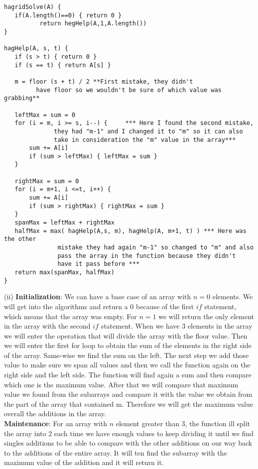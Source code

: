 \documentclass[12pt]{article} \setlength{\oddsidemargin}{0in}
\begin{document}
{\begin{verbatim}
hagridSolve(A) {
   if(A.length()==0) { return 0 }
          return hegHelp(A,1,A.length())
}

hagHelp(A, s, t) {
   if (s > t) { return 0 }
   if (s == t) { return A[s] }
   
   m = floor (s + t) / 2 **First mistake, they didn't
         have floor so we wouldn't be sure of which value was grabbing**
   
   leftMax = sum = 0
   for (i = m, i >= s, i--) {     *** Here I found the second mistake, 
              they had "m-1" and I changed it to "m" so it can also
              take in consideration the "m" value in the array*** 
       sum += A[i]
       if (sum > leftMax) { leftMax = sum }
   }

   rightMax = sum = 0
   for (i = m+1, i <=t, i++) {
       sum += A[i]
       if (sum > rightMax) { rightMax = sum }
   }
   spanMax = leftMax + rightMax
   halfMax = max( hagHelp(A,s, m), hagHelp(A, m+1, t) ) *** Here was the other 
               mistake they had again "m-1" so changed to "m" and also 
               pass the array in the function because they didn't
               have it pass before ***
   return max(spanMax, halfMax)
}
\end{verbatim}
(ii)  \textbf{Initialization}: We can have a base case of an array with $n = 0$ elements. We will get into the algorithms and return a 0 because of the first $if$ statement, which  means that the array was empty. For $n=1$ we will return the only element in the array with the second $if$ statement. When we have 3 elements in the array we will enter the operation that will divide the array with the floor value. Then we will enter the first for loop to obtain the sum of the elements in the right side of the array. Same-wise we find the sum on the left. The next step we add those value to make sure we span all values and then we call the function again on the right side and the left side. The function will find again a sum and then compare which one is the maximum value. After that we will compare that maximum value we found from the subarrays and compare it with the value we obtain from the part of the array that contained m. Therefore we will get the maximum value overall the additions in the array. \\
\textbf{Maintenance}: For an array with $n$ element greater than 3, the function ill split the array into 2 each time we have enough values to keep dividing it until we find singles additions to be able to compare with the other additions on our way back to the additions of the entire array. It will ten find the subarray with the maximum value of the addition and it will return it.\\
}
\end{document}
